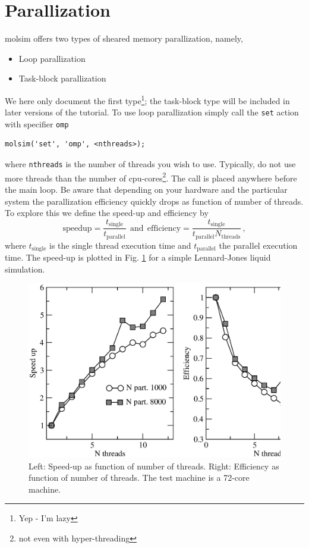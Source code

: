 \documentclass[11pt]{article}
\begin{document}
\section{Parallization}
\textsf{molsim} offers two types of sheared memory parallization, namely,
\begin{itemize}
\item Loop parallization 
\item Task-block parallization
\end{itemize}
We here only document the first type\footnote{Yep - I'm lazy}; the task-block
type will be included in later versions of the tutorial. To use loop
parallization simply call the \verb!set! action with specifier \verb!omp!
\begin{verbatim}
molsim('set', 'omp', <nthreads>);
\end{verbatim}
where \verb!nthreads! is the number of threads you wish to use. Typically, do
not use more threads than the number of cpu-cores\footnote{not even with
  hyper-threading}.  The call is placed anywhere before the main loop. Be aware
that depending on your hardware and the particular system the parallization
efficiency quickly drops as function of number of threads. To explore this we
define the speed-up and efficiency by
\begin{equation}
  \mathrm{speedup} = \frac{t_\mathrm{single}}{t_\mathrm{parallel}} \ \
  \mathrm{and} \ \ 
  \mathrm{efficiency} = \frac{t_\mathrm{single}}{t_\mathrm{parallel}
    N_\mathrm{threads}}
  \, ,
\end{equation}
where $t_\mathrm{single}$ is the single thread execution time and
$t_\mathrm{parallel}$ the parallel execution time. The speed-up is plotted in
Fig. \ref{fig:bench} for a simple Lennard-Jones liquid simulation.
\begin{figure}[h]
  \begin{center}
    \includegraphics[scale=.4]{speedup.eps}
  \caption{
    \label{fig:bench}
    Left: Speed-up as function of number of threads. Right: Efficiency as
    function of number of threads. The test machine is a 72-core machine.
  }
  \end{center}
\end{figure}
\end{document}
